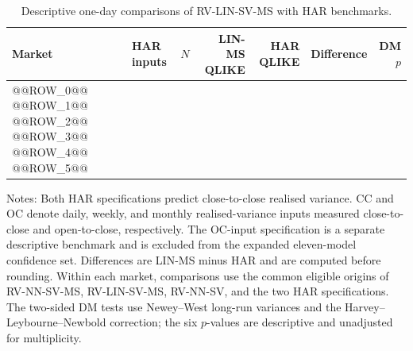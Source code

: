 \begin{table}[htbp]
\centering
\begin{threeparttable}
\caption{Descriptive one-day comparisons of RV-LIN-SV-MS with HAR benchmarks.}
\label{tab:oa-ms-har}
\scriptsize
\setlength{\tabcolsep}{3pt}
\begin{tabular*}{\textwidth}{@{\extracolsep{\fill}}llrrrrr@{}}
\toprule
Market & HAR inputs & $N$ & LIN-MS QLIKE & HAR QLIKE & Difference & DM $p$ \\
\midrule
@@ROW_0@@
@@ROW_1@@
@@ROW_2@@
@@ROW_3@@
@@ROW_4@@
@@ROW_5@@
\bottomrule
\end{tabular*}
\begin{tablenotes}[flushleft]
\footnotesize
\item Notes: Both HAR specifications predict close-to-close realised variance. CC and OC denote daily, weekly, and monthly realised-variance inputs measured close-to-close and open-to-close, respectively. The OC-input specification is a separate descriptive benchmark and is excluded from the expanded eleven-model confidence set. Differences are LIN-MS minus HAR and are computed before rounding. Within each market, comparisons use the common eligible origins of RV-NN-SV-MS, RV-LIN-SV-MS, RV-NN-SV, and the two HAR specifications. The two-sided DM tests use Newey--West long-run variances and the Harvey--Leybourne--Newbold correction; the six $p$-values are descriptive and unadjusted for multiplicity.
\end{tablenotes}
\end{threeparttable}
\end{table}
